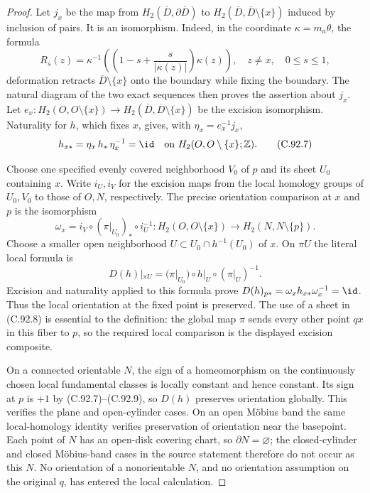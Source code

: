 \begin{proof}
Let $j_x$ be the map from
$H_2(\overline D,\partial\overline D)$ to
$H_2(\overline D,\overline D\setminus\{x\})$ induced by inclusion
of pairs. It is an isomorphism. Indeed, in the coordinate
$\kappa=m_a\theta$, the formula
\[
 R_s(z)=\kappa^{-1}
       \left(\left(1-s+\frac{s}{|\kappa(z)|}\right)\kappa(z)\right),
 \quad z\ne x,\quad 0\leq s\leq1,                             \tag{C.92.6}
\]
deformation retracts $\overline D\setminus\{x\}$ onto the boundary
while fixing the boundary. The natural diagram of the two exact
sequences then proves the assertion about $j_x$.
Let
$e_x:H_2(O,O\setminus\{x\})\to
H_2(\overline D,\overline D\setminus\{x\})$
be the excision isomorphism. Naturality for $h$, which fixes $x$,
gives, with $\eta_x=e_x^{-1}j_x$,
\[
 h_{x*}=\eta_x\,h_*\,\eta_x^{-1}
       =\id\quad\hbox{on }H_2(O,O\setminus\{x\};\mathbb Z).
                                                               \tag{C.92.7}
\]

Choose one specified evenly covered neighborhood $V_0$ of $p$
and its sheet $U_0$ containing $x$. Write $i_U,i_V$ for the
excision maps from the local homology groups of $U_0,V_0$
to those of $O,N$, respectively. The precise orientation
comparison at $x$ and $p$ is the isomorphism
\[
 \omega_x=i_V\circ(\pi|_{U_0})_*\circ i_U^{-1}:
 H_2(O,O\setminus\{x\})
        \longrightarrow H_2(N,N\setminus\{p\}).
                                                               \tag{C.92.8}
\]
Choose a smaller open neighborhood
$U\subset U_0\cap h^{-1}(U_0)$ of $x$.
On $\pi U$ the literal local formula is
\[
 D(h)|_{\pi U}
     =(\pi|_{U_0})\circ h|_U\circ(\pi|_U)^{-1}.
                                                               \tag{C.92.9}
\]
Excision and naturality applied to this formula prove
$D(h)_{p*}=\omega_xh_{x*}\omega_x^{-1}=\id$.
Thus the local orientation at the fixed point is preserved.
The use of a sheet in (C.92.8) is essential to the definition:
the global map $\pi$ sends every other point $qx$ in this fiber
to $p$, so the required local comparison is the displayed
excision composite.

On a connected orientable $N$, the sign of a homeomorphism on
the continuously chosen local fundamental classes is locally
constant and hence constant. Its sign at $p$ is $+1$ by
(C.92.7)--(C.92.9), so $D(h)$ preserves orientation globally.
This verifies the plane and open-cylinder cases.
On an open M\"obius band the same local-homology identity
verifies preservation of orientation near the basepoint.
Each point of $N$ has an open-disk covering chart, so
$\partial N=\varnothing$; the closed-cylinder and closed
M\"obius-band cases in the source statement therefore do
not occur as this $N$. No orientation of a nonorientable
$N$, and no orientation assumption on the original $q$,
has entered the local calculation.


\end{proof}
